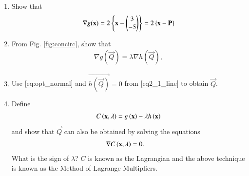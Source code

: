 \begin{enumerate}[label=\arabic*.,ref=\thesection.\theenumi]
\item Show that 
\begin{align}
\nabla g(\mathbf{x}) = 2\left\{\mathbf{x}-\begin{pmatrix}3 \\ -5\end{pmatrix}\right\} = 2\left\{\mathbf{x}-\mathbf{P}\right\}
\end{align}
%
\item From Fig. \ref{fig:concirc}, show that 
\begin{align}
\label{eq:opt_normal}
\nabla g(\vec{Q}) = \lambda \nabla h(\vec{Q}),
\end{align}
%
\item Use \eqref{eq:opt_normal} and $\vec{h(\vec{Q})}=0$ from \eqref{eq2_1_line} to obtain $\vec{Q}$.
\item
\label{lagrange}
	Define 
	\begin{equation}
	\label{lagrangian}
	C\brak{\mbf{x},\lambda} = g\brak{\mbf{x}} - \lambda h\brak{\mbf{x}}%
	\end{equation}
and show that $\vec{Q}$ can also be obtained by 
solving the equations
%
\begin{align}
\nabla C\left(\mathbf{x},\lambda\right) &= 0.
\label{tangent}
\end{align}
%
What is the sign of $\lambda$?  $C$ is known as the Lagrangian and the above technique is known as the Method of Lagrange Multipliers.


\end{enumerate}
